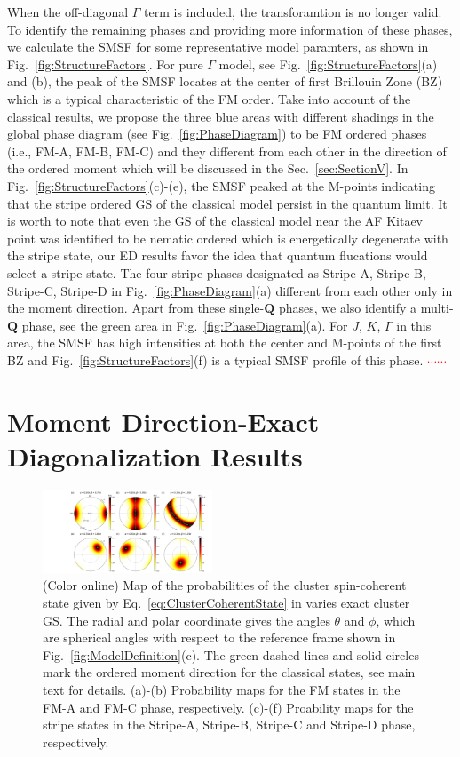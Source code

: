 \documentclass[aps,prb,reprint,amsfonts,amsmath,amssymb,showpacs,groupedaddress,superscriptaddress]{revtex4-1}
\begin{document}
When the off-diagonal $\Gamma$ term is included, the transforamtion is no longer valid. To identify the remaining phases and providing more information of these phases, we calculate the SMSF for some representative model paramters, as shown in Fig.~\ref{fig:StructureFactors}. For pure $\Gamma$ model, see Fig.~\ref{fig:StructureFactors}(a) and (b), the peak of the SMSF locates at the center of first Brillouin Zone (BZ) which is a typical characteristic of the FM order. Take into account of the classical results, we propose the three blue areas with different shadings in the global phase diagram (see Fig.~\ref{fig:PhaseDiagram}) to be FM ordered phases (i.e., FM-A, FM-B, FM-C) and they different from each other in the direction of the ordered moment which will be discussed in the Sec.~\ref{sec:SectionV}. In Fig.~\ref{fig:StructureFactors}(c)-(e), the SMSF peaked at the M-points indicating that the stripe ordered GS of the classical model persist in the quantum limit. It is worth to note that even the GS of the classical model near the AF Kitaev point was identified to be nematic ordered which is energetically degenerate with the stripe state, our ED results favor the idea that quantum flucations would select a stripe state. The four stripe phases designated as Stripe-A, Stripe-B, Stripe-C, Stripe-D in Fig.~\ref{fig:PhaseDiagram}(a) different from each other only in the moment direction. Apart from these single-$\mathbf{Q}$ phases, we also identify a multi-$\mathbf{Q}$ phase, see the green area in Fig.~\ref{fig:PhaseDiagram}(a). For $J$, $K$, $\Gamma$ in this area, the SMSF has high intensities at both the center and M-points of the first BZ and Fig.~\ref{fig:StructureFactors}(f) is a typical SMSF profile of this phase. \textcolor{red}{$\cdots \cdots$}

\section{\label{sec:SectionV}Moment Direction-Exact Diagonalization Results}
\begin{figure}
    \includegraphics[width=0.45\textwidth]{Fig4.pdf}
    \caption{\label{fig:Proabilities}(Color online) Map of the probabilities of the cluster spin-coherent state given by Eq.~\eqref{eq:ClusterCoherentState} in varies exact cluster GS. The radial and polar coordinate gives the angles $\theta$ and $\phi$, which are spherical angles with respect to the reference frame shown in Fig.~\ref{fig:ModelDefinition}(c). The green dashed lines and solid circles mark the ordered moment direction for the classical states, see main text for details. (a)-(b) Probability maps for the FM states in the FM-A and FM-C phase, respectively. (c)-(f) Proability maps for the stripe states in the Stripe-A, Stripe-B, Stripe-C and Stripe-D phase, respectively.}
\end{figure}
\end{document}
